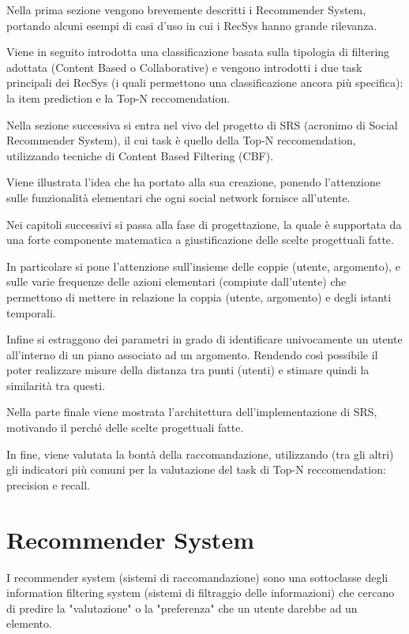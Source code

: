 Nella prima sezione vengono brevemente descritti i Recommender System, portando alcuni esempi di casi d'uso in cui i RecSys hanno grande rilevanza.

Viene in seguito introdotta una classificazione basata sulla tipologia di filtering adottata (Content Based o Collaborative) e vengono introdotti i due task principali dei RecSys (i quali permettono una classificazione ancora più specifica): la item prediction e la Top-N reccomendation.

Nella sezione successiva si entra nel vivo del progetto di SRS (acronimo di Social Recommender System), il cui task è quello della Top-N reccomendation, utilizzando tecniche di Content Based Filtering (CBF).

Viene illustrata l'idea che ha portato alla sua creazione, ponendo l'attenzione sulle funzionalità elementari che ogni social network fornisce all'utente.

Nei capitoli successivi si passa alla fase di progettazione, la quale è supportata da una forte componente matematica a giustificazione delle scelte progettuali fatte.

In particolare si pone l'attenzione sull'insieme delle coppie (utente, argomento), e sulle varie frequenze delle azioni elementari (compiute dall'utente) che permettono di mettere in relazione la coppia (utente, argomento) e degli istanti temporali.

Infine si estraggono dei parametri in grado di identificare univocamente un utente all'interno di un piano associato ad un argomento. Rendendo così possibile il poter realizzare misure della distanza tra punti (utenti) e stimare quindi la similarità tra questi.

Nella parte finale viene mostrata l'architettura dell'implementazione di SRS, motivando il perché delle scelte progettuali fatte.

In fine, viene valutata la bontà della raccomandazione, utilizzando (tra gli altri) gli indicatori più comuni per la valutazione del task di Top-N reccomendation: precision e recall.
\clearpage
\section{Recommender System}
I recommender system (sistemi di raccomandazione) sono una sottoclasse degli information filtering system (sistemi di filtraggio delle informazioni) che cercano di predire la "valutazione" o la "preferenza" che un utente darebbe ad un elemento.

